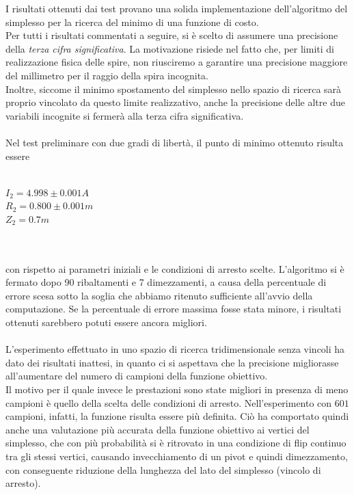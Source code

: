 \documentclass[a4paper, 11pt]{article}
\begin{document}
I risultati ottenuti dai test provano una solida implementazione dell'algoritmo
del simplesso per la ricerca del minimo di una funzione di costo. \\
Per tutti i risultati commentati a seguire, si è scelto di assumere una
precisione della \emph{terza cifra significativa}. La motivazione risiede nel
fatto che, per limiti di realizzazione fisica delle spire, non riusciremo a
garantire una precisione maggiore del millimetro per il raggio della spira
incognita. \\ 
Inoltre, siccome il minimo spostamento del simplesso nello spazio di ricerca
sarà proprio vincolato da questo limite realizzativo, anche la precisione delle
altre due variabili incognite si fermerà alla terza cifra significativa. \\ \\
Nel test preliminare con due gradi di libertà, il punto di minimo ottenuto
risulta essere \\ \\
\centerline{ $I_{2} = 4.998 \pm 0.001 A$ \\ $R_{2} = 0.800 \pm 0.001m$ \\ $Z_{2}
= 0.7m$} \\ \\
con rispetto ai parametri iniziali e le condizioni di arresto scelte.
L'algoritmo si è fermato dopo 90 ribaltamenti e 7 dimezzamenti, a causa della
percentuale di errore scesa sotto la soglia che abbiamo ritenuto sufficiente
all'avvio della computazione. Se la percentuale di errore massima fosse stata
minore, i risultati ottenuti sarebbero potuti essere ancora migliori. \\
\\
L'esperimento effettuato in uno spazio di ricerca tridimensionale senza vincoli
ha dato dei risultati inattesi, in quanto ci si aspettava che la precisione
migliorasse all'aumentare del numero di campioni della funzione obiettivo. \\
Il motivo per il quale invece le prestazioni sono state migliori in presenza di
meno campioni è quello della scelta delle condizioni di arresto.
Nell'esperimento con $601$ campioni, infatti, la funzione risulta essere più
definita. Ciò ha comportato quindi anche una valutazione più accurata della
funzione obiettivo ai vertici del simplesso, che con più probabilità si è
ritrovato in una condizione di flip continuo tra gli stessi vertici, causando
invecchiamento di un pivot e quindi dimezzamento, con conseguente riduzione
della lunghezza del lato del simplesso (vincolo di arresto). \\
\end{document}
